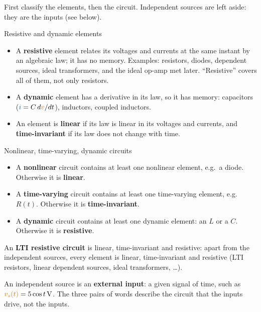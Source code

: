 \documentclass[11pt,a4paper]{article}
\newcommand{\Icol}[1]{\textcolor{ccur}{#1}}
\newcommand{\Vcol}[1]{\textcolor{cvolt}{#1}}
\begin{document}
First classify the elements, then the circuit. Independent sources are left aside: they are
the inputs (see below).

\begin{definitionbox}{Resistive and dynamic elements}
\begin{itemize}
  \item A \textbf{resistive} element relates its voltages and currents at the same instant by
        an algebraic law; it has no memory. Examples: resistors, diodes, dependent sources,
        ideal transformers, and the ideal op-amp met later. ``Resistive'' covers all of them,
        not only resistors.
  \item A \textbf{dynamic} element has a derivative in its law, so it has memory: capacitors
        ($\Icol{i} = C\,d\Vcol{v}/dt$), inductors, coupled inductors.
  \item An element is \textbf{linear} if its law is linear in its voltages and currents, and
        \textbf{time-invariant} if its law does not change with time.
\end{itemize}
\end{definitionbox}

\begin{definitionbox}{Nonlinear, time-varying, dynamic circuits}
\begin{itemize}
  \item A \textbf{nonlinear} circuit contains at least one nonlinear element, e.g.\ a diode. Otherwise it is
        \textbf{linear}.
  \item A \textbf{time-varying} circuit contains at least one time-varying element, e.g.\ $R(t)$. Otherwise it is
        \textbf{time-invariant}.
  \item A \textbf{dynamic} circuit contains at least one dynamic element: an $L$ or a $C$. Otherwise it is
        \textbf{resistive}.
\end{itemize}
An \textbf{LTI resistive circuit} is linear, time-invariant and resistive: apart from the
independent sources, every element is linear, time-invariant and resistive (LTI resistors,
linear dependent sources, ideal transformers, \dots).
\end{definitionbox}

\begin{ideabox}
An independent source is an \textbf{external input}: a given signal of time, such as
$\Vcol{v_s(t)} = 5\cos t\V$. The three pairs of words describe the circuit that the inputs
drive, not the inputs.
\end{ideabox}
\end{document}
